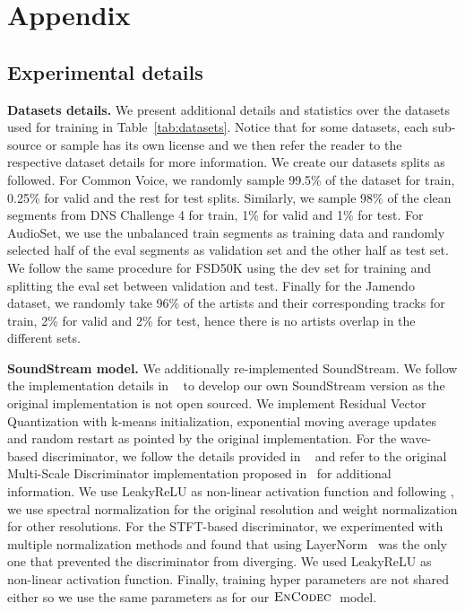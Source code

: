 \appendix


\section{Appendix}

\subsection{Experimental details}
\label{sec:exp_details}

{\noindent \bf Datasets details.} 
We present additional details and statistics over the datasets used for training in Table~\ref{tab:datasets}. Notice that for some datasets, each sub-source or sample has its own license and we then refer the reader to the respective dataset details for more information. 
We create our datasets splits as followed. For Common Voice, we randomly sample 99.5\% of the dataset for train, 0.25\% for valid and the rest for test splits. Similarly, we sample 98\% of the clean segments from DNS Challenge 4 for train, 1\% for valid and 1\% for test.
For AudioSet, we use the unbalanced train segments as training data and randomly selected half of the eval segments as validation set and the other half as test set. We follow the same procedure for FSD50K using the dev set for training and splitting the eval set between validation and test. Finally for the Jamendo dataset, we randomly take 96\% of the artists and their corresponding tracks for train, 2\% for valid and 2\% for test, hence there is no artists overlap in the different sets.

{\noindent \bf SoundStream model.}
We additionally re-implemented SoundStream. We follow the implementation details in ~\citet{zeghidour2021soundstream} to develop our own SoundStream version as the original implementation is not open sourced.  
We implement Residual Vector Quantization with k-means initialization, exponential moving average updates and random restart as pointed by the original implementation.
For the wave-based discriminator, we follow the details provided in ~\citet{zeghidour2021soundstream} and refer to the original Multi-Scale Discriminator implementation proposed in~\citet{melgan} for additional information. We use LeakyReLU as non-linear activation function and following \citet{hifigan}, we use spectral normalization for the original resolution and weight normalization for other resolutions. For the STFT-based discriminator, we experimented with multiple normalization methods and found that using LayerNorm~\citep{ba2016layer} was the only one that prevented the discriminator from diverging. We used LeakyReLU as non-linear activation function.
Finally, training hyper parameters are not shared either so we use the same parameters as for our $\textsc{EnCodec}~$ model.  


